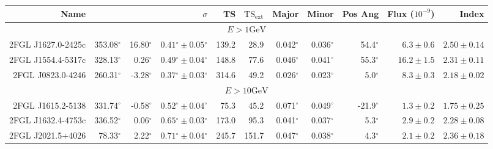 \documentclass[12pt,preprint]{aastex}
\newcommand{\gev}{\text{GeV}\xspace}
\newcommand{\tsext}{{\ensuremath{\text{TS}_\text{ext}}}\xspace}
\newcommand{\glon}{\text{GLON}\xspace}
\newcommand{\glat}{\text{GLAT}\xspace}
\renewcommand{\deg}{\ensuremath{^\circ}\xspace}
\begin{document}


\clearpage
\begin{table}
  \begin{centering}
    \begin{tabular}{r|rrrrrrrrrr}
      \hline
      \hline
      Name                 &          \glon &          \glat &                    $\sigma$ &       TS &   $\tsext$ &      Major &      Minor &    Pos Ang &      Flux ($10^{-9}$) &                 Index \\
      \hline
      \multicolumn{11}{c}{$E > 1\gev$} \\
      \hline
      2FGL J1627.0-2425c   &     353.08\deg &      16.80\deg & $  0.41\deg \pm   0.05\deg$ &    139.2 &       28.9 &  0.042\deg &  0.036\deg &   54.4\deg & $    6.3 \pm     0.6$ & $   2.50 \pm    0.14$ \\
      2FGL J1554.4-5317c   &     328.13\deg &       0.26\deg & $  0.49\deg \pm   0.04\deg$ &    148.8 &       77.6 &  0.046\deg &  0.041\deg &   55.3\deg & $   16.2 \pm     1.5$ & $   2.31 \pm    0.11$ \\
      2FGL J0823.0-4246    &     260.31\deg &      -3.28\deg & $  0.37\deg \pm   0.03\deg$ &    314.6 &       49.2 &  0.026\deg &  0.023\deg &    5.0\deg & $    8.3 \pm     0.3$ & $   2.18 \pm    0.02$ \\
      \hline
      \multicolumn{11}{c}{$E > 10\gev$} \\
      \hline
      2FGL J1615.2-5138          &     331.74\deg &      -0.58\deg & $  0.52\deg \pm   0.04\deg$ &     75.3 &       45.2 &  0.071\deg &  0.049\deg &  -21.9\deg & $    1.3 \pm     0.2$ & $   1.75 \pm    0.25$ \\
      2FGL J1632.4-4753c         &     336.52\deg &       0.06\deg & $  0.65\deg \pm   0.03\deg$ &    173.0 &       95.3 &  0.041\deg &  0.037\deg &    5.3\deg & $    2.9 \pm     0.2$ & $   2.28 \pm    0.08$ \\
      2FGL J2021.5+4026          &      78.33\deg &       2.22\deg & $  0.71\deg \pm   0.04\deg$ &    245.7 &      151.7 &  0.047\deg &  0.038\deg &    4.3\deg & $    2.1 \pm     0.2$ & $   2.36 \pm    0.18$ \\

\end{tabular}
\end{centering}
\end{table}
\end{document}
